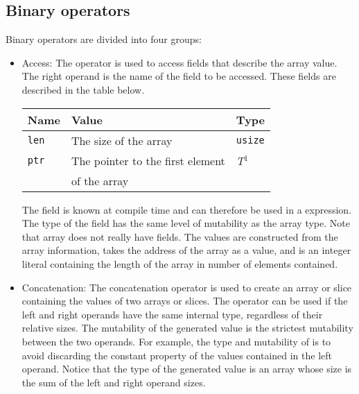 \subsection {Binary operators}

Binary operators are divided into four groups:

\begin{itemize}
\item Access: The  operator is used to access fields that describe the
  array value. The right operand is the name of the field to be accessed. These
  fields are described in the table below.

  \begin{center}\begin{adjustbox}{max width=\linewidth}
      \begin{threeparttable}
        \begin{tabular}{|l|ll|}
          \hline
          Name & Value & Type\\
          \hline
          \hline
          \texttt{len} & The size of the array & \texttt{usize} \\
          \texttt{ptr} & The pointer to the first element  & \textit{T}$^{1^{\phantom{J}}}$\\
          & of the array & \\
          \hline
        \end{tabular}
      \end{threeparttable}
\end{adjustbox}\end{center}

The  field is known at compile time and can therefore be used in
a  expression. The type of the  field has the same
level of mutability as the array type. Note that array does not really have
fields. The values are constructed from the array information, 
takes the address of the array as a value, and  is an integer
literal containing the length of the array in number of elements contained.

\item Concatenation: The concatenation operator \token{\~} is used to create an
  array or slice containing the values of two arrays or slices. The operator can
  be used if the left and right operands have the same internal type, regardless
  of their relative sizes. The mutability of the generated value is the
  strictest mutability between the two operands. For example, the type and
  mutability of  is \token{[*i32 ;
      6]} to avoid discarding the constant property of the values contained in
  the left operand. Notice that the type of the generated value is an array
  whose size is the sum of the left and right operand sizes.


\end{itemize}
